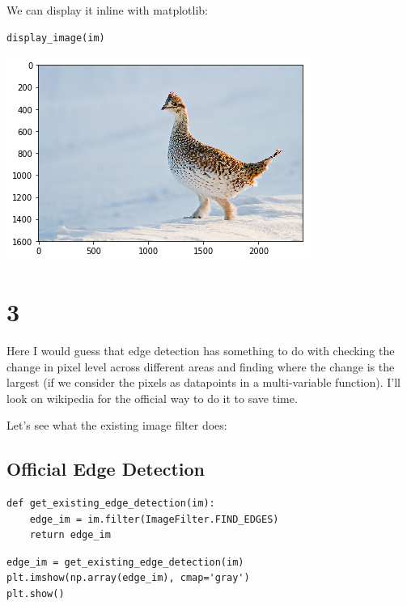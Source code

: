 \documentclass[11pt]{article}
\begin{document}
We can display it inline with matplotlib:

\begin{verbatim}
display_image(im)
\end{verbatim}

\includegraphics[width=.9\linewidth]{./obipy-resources/333kTu.png}

\section*{3}
\label{sec-3}
Here I would guess that edge detection has something to do with checking the
change in pixel level across different areas and finding where the change is
the largest (if we consider the pixels as datapoints in a multi-variable
function). I'll look on wikipedia for the official way to do it to save time.

Let's see what the existing image filter does:

\subsection*{Official Edge Detection}
\label{sec-3-1}

\begin{verbatim}
def get_existing_edge_detection(im):
    edge_im = im.filter(ImageFilter.FIND_EDGES)
    return edge_im
\end{verbatim}


\begin{verbatim}
edge_im = get_existing_edge_detection(im)
plt.imshow(np.array(edge_im), cmap='gray')
plt.show()
\end{verbatim}
\end{document}
